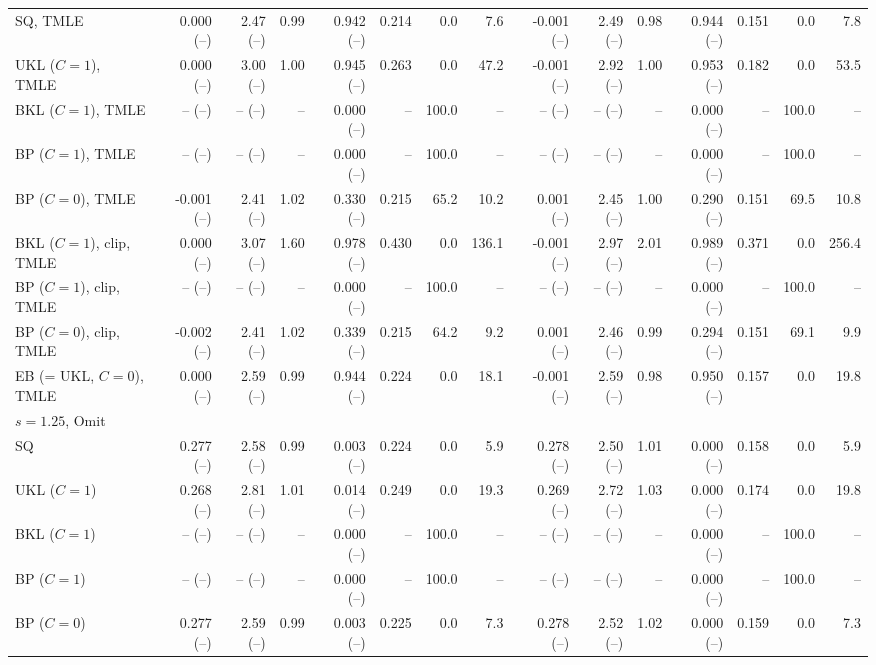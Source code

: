 \begin{tabular}{lrrrrrrrrrrrrrr}
SQ, TMLE & 0.000 (--) & 2.47 (--) & 0.99 & 0.942 (--) & 0.214 & 0.0 & 7.6 & -0.001 (--) & 2.49 (--) & 0.98 & 0.944 (--) & 0.151 & 0.0 & 7.8 \\
UKL ($C=1$), TMLE & 0.000 (--) & 3.00 (--) & 1.00 & 0.945 (--) & 0.263 & 0.0 & 47.2 & -0.001 (--) & 2.92 (--) & 1.00 & 0.953 (--) & 0.182 & 0.0 & 53.5 \\
BKL ($C=1$), TMLE & -- (--) & -- (--) & -- & 0.000 (--) & -- & 100.0 & -- & -- (--) & -- (--) & -- & 0.000 (--) & -- & 100.0 & -- \\
BP ($C=1$), TMLE & -- (--) & -- (--) & -- & 0.000 (--) & -- & 100.0 & -- & -- (--) & -- (--) & -- & 0.000 (--) & -- & 100.0 & -- \\
BP ($C=0$), TMLE & -0.001 (--) & 2.41 (--) & 1.02 & 0.330 (--) & 0.215 & 65.2 & 10.2 & 0.001 (--) & 2.45 (--) & 1.00 & 0.290 (--) & 0.151 & 69.5 & 10.8 \\
BKL ($C=1$), clip, TMLE & 0.000 (--) & 3.07 (--) & 1.60 & 0.978 (--) & 0.430 & 0.0 & 136.1 & -0.001 (--) & 2.97 (--) & 2.01 & 0.989 (--) & 0.371 & 0.0 & 256.4 \\
BP ($C=1$), clip, TMLE & -- (--) & -- (--) & -- & 0.000 (--) & -- & 100.0 & -- & -- (--) & -- (--) & -- & 0.000 (--) & -- & 100.0 & -- \\
BP ($C=0$), clip, TMLE & -0.002 (--) & 2.41 (--) & 1.02 & 0.339 (--) & 0.215 & 64.2 & 9.2 & 0.001 (--) & 2.46 (--) & 0.99 & 0.294 (--) & 0.151 & 69.1 & 9.9 \\
EB (= UKL, $C=0$), TMLE & 0.000 (--) & 2.59 (--) & 0.99 & 0.944 (--) & 0.224 & 0.0 & 18.1 & -0.001 (--) & 2.59 (--) & 0.98 & 0.950 (--) & 0.157 & 0.0 & 19.8 \\
\multicolumn{15}{l}{$s=1.25$, Omit} \\
SQ & 0.277 (--) & 2.58 (--) & 0.99 & 0.003 (--) & 0.224 & 0.0 & 5.9 & 0.278 (--) & 2.50 (--) & 1.01 & 0.000 (--) & 0.158 & 0.0 & 5.9 \\
UKL ($C=1$) & 0.268 (--) & 2.81 (--) & 1.01 & 0.014 (--) & 0.249 & 0.0 & 19.3 & 0.269 (--) & 2.72 (--) & 1.03 & 0.000 (--) & 0.174 & 0.0 & 19.8 \\
BKL ($C=1$) & -- (--) & -- (--) & -- & 0.000 (--) & -- & 100.0 & -- & -- (--) & -- (--) & -- & 0.000 (--) & -- & 100.0 & -- \\
BP ($C=1$) & -- (--) & -- (--) & -- & 0.000 (--) & -- & 100.0 & -- & -- (--) & -- (--) & -- & 0.000 (--) & -- & 100.0 & -- \\
BP ($C=0$) & 0.277 (--) & 2.59 (--) & 0.99 & 0.003 (--) & 0.225 & 0.0 & 7.3 & 0.278 (--) & 2.52 (--) & 1.02 & 0.000 (--) & 0.159 & 0.0 & 7.3 \\

\end{tabular}
